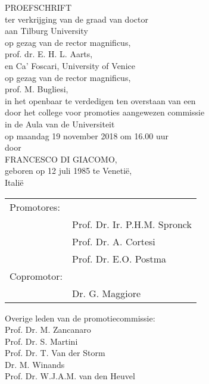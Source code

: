 \begin{titlepage}\centering
  \large \thetitle
	
	\vspace*{1.5cm}
	\large PROEFSCHRIFT\\
	\vspace*{1.5cm}
ter verkrijging van de graad van doctor\\
aan Tilburg University\\
op gezag van de rector magnificus,\\
prof. dr. E. H. L. Aarts,\\
en Ca' Foscari, University of Venice\\
op gezag van de rector magnificus,\\
prof. M. Bugliesi,\\
in het openbaar te verdedigen ten overstaan van een\\
door het college voor promoties aangewezen commissie\\
in de Aula van de Universiteit\\
op maandag 19 november 2018 om 16.00 uur\\
\vspace*{1.5cm}
door\\
\vspace*{1.5cm}
\large FRANCESCO DI GIACOMO,\\
\vspace*{1.5cm}
geboren op 12 juli 1985 te Venetië,\\
Italië

\newpage
\flushleft

\begin{tabular}{l l}
Promotores: &\\
& Prof. Dr. Ir. P.H.M. Spronck\\
& Prof. Dr. A. Cortesi\\
& Prof. Dr. E.O. Postma\\
Copromotor: &\\
& Dr. G. Maggiore
\end{tabular}

\vspace{2.5cm}

Overige leden van de promotiecommissie:\\
\hspace{1.5cm} Prof. Dr. M. Zancanaro\\
\hspace{1.5cm} Prof. Dr. S. Martini\\
\hspace{1.5cm} Prof. Dr. T. Van der Storm\\
\hspace{1.5cm} Dr. M. Winands\\
\hspace{1.5cm} Prof. Dr. W.J.A.M. van den Heuvel

\end{titlepage}

\cleardoublepage